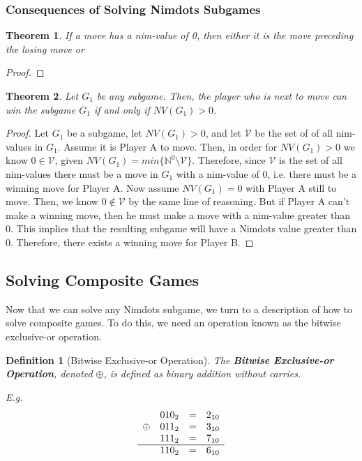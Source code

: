 \documentclass[12pt,twoside]{reedthesis}
\newtheorem{mydef}{Definition}
\newtheorem{theorem}{Theorem}
\begin{document}
\subsubsection{Consequences of Solving Nimdots Subgames}

\begin{theorem}
If a move has a nim-value of 0, then either it is the move preceding the losing move or  
\end{theorem}

\begin{proof}

\end{proof}

\begin{theorem}
Let $G_1$ be any subgame.  Then, the player who is next to move can win the subgame $G_1$ if and only if $NV(G_1)>0$.
\end{theorem}

\begin{proof}
Let $G_1$ be a subgame, let $NV(G_1)>0$, and let $\mathcal{V}$ be the set of of all nim-values in $G_1$.  Assume it is Player A to move.  Then, in order for $NV(G_1)>0$ we know $0 \in \mathcal{V}$, given $NV(G_1) = min \{ \mathbb N^0 \setminus \mathcal{V} \}$.  Therefore, since $\mathcal{V}$ is the set of all nim-values there must be a move in $G_1$ with a nim-value of 0, i.e. there must be a winning move for Player A.  Now assume $NV(G_1)=0$ with Player A still to move.  Then, we know $0 \notin \mathcal{V}$ by the same line of reasoning.  But if Player A can't make a winning move, then he must make a move with a nim-value greater than 0.  This implies that the resulting subgame will have a Nimdots value greater than 0.  Therefore, there exists a winning move for Player B.
\end{proof}


\subsection{Solving Composite Games}
Now that we can solve any Nimdots subgame, we turn to a description of how to solve composite games.  To do this, we need an operation known as the bitwise exclusive-or operation.

\begin{mydef}[Bitwise Exclusive-or Operation]
The \textbf{Bitwise Exclusive-or Operation}, denoted $\oplus$, is defined as binary addition without carries.
\end{mydef}

\noindent
\emph{E.g.}
\begin{equation}
\begin{array}{rlcl} 
& 010_2 & = & 2_{10} \\
\oplus & 011_2 & = & 3_{10} \\
& 111_2 & = & 7_{10} \\
\hline
& 110_2 & = & 6_{10}
\end{array}
\end{equation}
\end{document}
